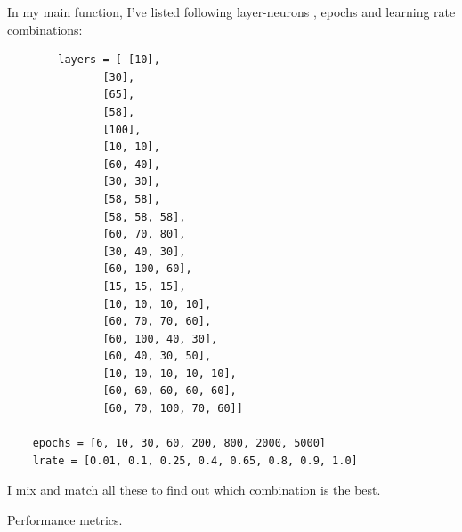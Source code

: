 \documentclass[12pt, letterpaper]{article}
\begin{document}
\begin{enumerate}[label=\Roman*.]
	In my main function, I've listed following layer-neurons , epochs and learning rate combinations:
	\begin{verbatim}
	    layers = [ [10],
               [30],
               [65],
               [58],
               [100],
               [10, 10],
               [60, 40],
               [30, 30],
               [58, 58],
               [58, 58, 58],
               [60, 70, 80],
               [30, 40, 30],
               [60, 100, 60],
               [15, 15, 15],
               [10, 10, 10, 10],
               [60, 70, 70, 60],
               [60, 100, 40, 30],
               [60, 40, 30, 50],
               [10, 10, 10, 10, 10],
               [60, 60, 60, 60, 60],
               [60, 70, 100, 70, 60]]
               
    epochs = [6, 10, 30, 60, 200, 800, 2000, 5000]
    lrate = [0.01, 0.1, 0.25, 0.4, 0.65, 0.8, 0.9, 1.0]
	\end{verbatim}
	 I mix and match all these to find out which combination is the best.
	 
	{\bf \item Performance metrics.}\\
	

\end{enumerate}
\end{document}
